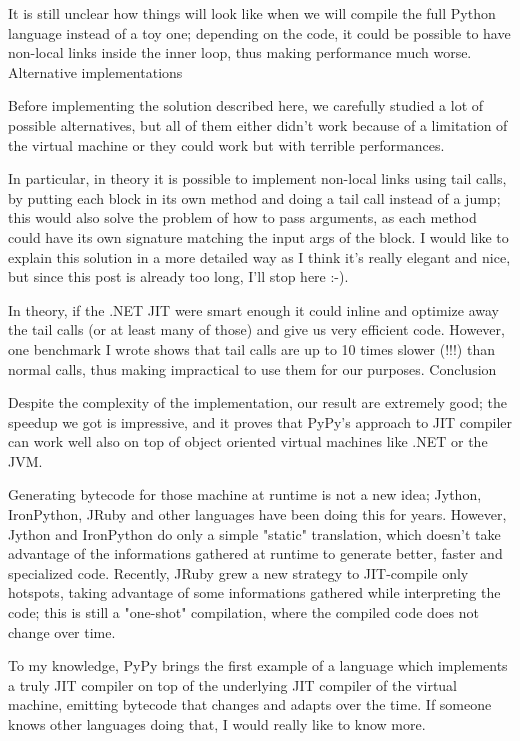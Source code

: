 {It is still unclear how things will look like when we will compile the full Python language instead of a toy one; depending on the code, it could be possible to have non-local links inside the inner loop, thus making performance much worse.
Alternative implementations

Before implementing the solution described here, we carefully studied a lot of possible alternatives, but all of them either didn't work because of a limitation of the virtual machine or they could work but with terrible performances.

In particular, in theory it is possible to implement non-local links using tail calls, by putting each block in its own method and doing a tail call instead of a jump; this would also solve the problem of how to pass arguments, as each method could have its own signature matching the input args of the block. I would like to explain this solution in a more detailed way as I think it's really elegant and nice, but since this post is already too long, I'll stop here :-).

In theory, if the .NET JIT were smart enough it could inline and optimize away the tail calls (or at least many of those) and give us very efficient code. However, one benchmark I wrote shows that tail calls are up to 10 times slower (!!!) than normal calls, thus making impractical to use them for our purposes.
Conclusion

Despite the complexity of the implementation, our result are extremely good; the speedup we got is impressive, and it proves that PyPy's approach to JIT compiler can work well also on top of object oriented virtual machines like .NET or the JVM.

Generating bytecode for those machine at runtime is not a new idea; Jython, IronPython, JRuby and other languages have been doing this for years. However, Jython and IronPython do only a simple "static" translation, which doesn't take advantage of the informations gathered at runtime to generate better, faster and specialized code. Recently, JRuby grew a new strategy to JIT-compile only hotspots, taking advantage of some informations gathered while interpreting the code; this is still a "one-shot" compilation, where the compiled code does not change over time.

To my knowledge, PyPy brings the first example of a language which implements a truly JIT compiler on top of the underlying JIT compiler of the virtual machine, emitting bytecode that changes and adapts over the time. If someone knows other languages doing that, I would really like to know more.

}
